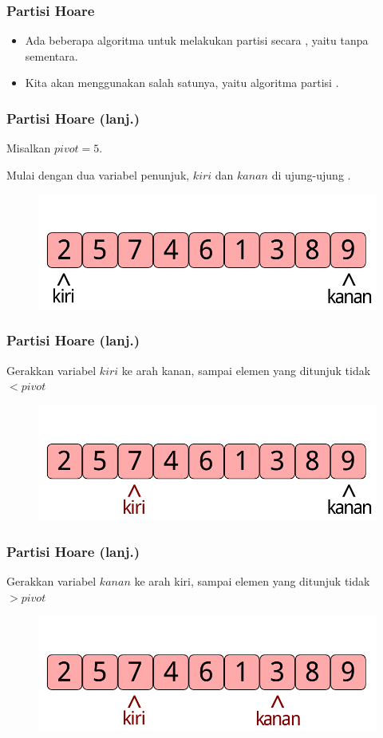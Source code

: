 \begin{frame}
\frametitle{Partisi Hoare}
\begin{itemize}
  \item Ada beberapa algoritma untuk melakukan partisi secara , yaitu tanpa \farray sementara.
  \item Kita akan menggunakan salah satunya, yaitu algoritma partisi .
\end{itemize}
\end{frame}

\begin{frame}
\frametitle{Partisi Hoare (lanj.)}
Misalkan $pivot = 5$.

Mulai dengan dua variabel penunjuk, $kiri$ dan $kanan$ di ujung-ujung \farray.
\begin{figure}
  \centering
  \includegraphics[width=7 cm]{asset/partition-1.pdf}
\end{figure}
\end{frame}

\begin{frame}
\frametitle{Partisi Hoare (lanj.)}
Gerakkan variabel $kiri$ ke arah kanan, sampai elemen yang ditunjuk tidak $< pivot$
\begin{figure}
  \centering
  \includegraphics[width=7 cm]{asset/partition-2.pdf}
\end{figure}
\end{frame}

\begin{frame}
\frametitle{Partisi Hoare (lanj.)}
Gerakkan variabel $kanan$ ke arah kiri, sampai elemen yang ditunjuk tidak $> pivot$
\begin{figure}
  \centering
  \includegraphics[width=7 cm]{asset/partition-3.pdf}
\end{figure}
\end{frame}

